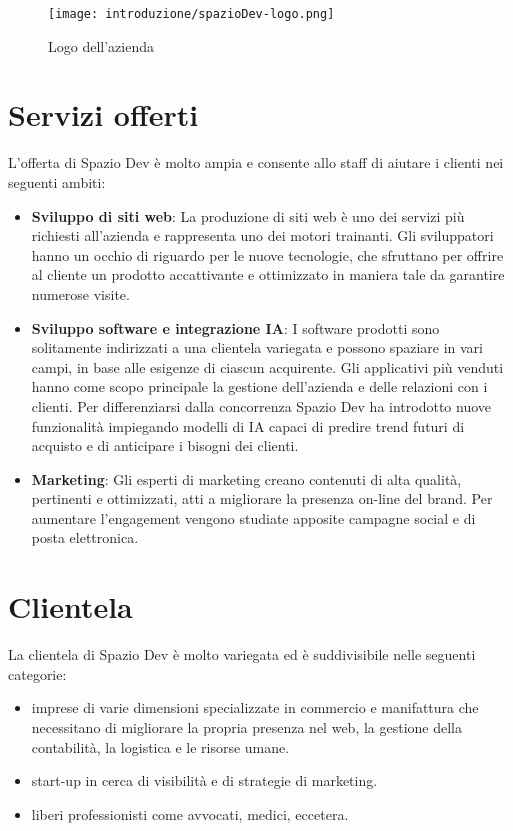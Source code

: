 \begin{figure}[!h] 
  \centering 
  \texttt{[image: introduzione/spazioDev-logo.png]} 
  \caption{Logo dell'azienda}
\end{figure}

\newpage

\section{Servizi offerti}
L'offerta di Spazio Dev è molto ampia e consente allo staff di aiutare i clienti nei seguenti ambiti:
\begin{itemize}
  \item \textbf{Sviluppo di siti web}: La produzione di siti web è uno dei servizi più richiesti all'azienda e rappresenta uno dei motori trainanti. Gli sviluppatori hanno un occhio di riguardo per le nuove tecnologie, che sfruttano per offrire al cliente un prodotto accattivante e ottimizzato in maniera tale da garantire numerose visite.
  \item \textbf{Sviluppo software e integrazione IA}: I software prodotti sono solitamente indirizzati a una clientela variegata e possono spaziare in vari campi, in base alle esigenze di ciascun acquirente. Gli applicativi più venduti hanno come scopo principale la gestione dell'azienda e delle relazioni con i clienti. Per differenziarsi dalla concorrenza Spazio Dev ha introdotto nuove funzionalità impiegando modelli di IA capaci di predire trend futuri di acquisto e  di anticipare i bisogni dei clienti.
  \item \textbf{Marketing}: Gli esperti di marketing creano contenuti di alta qualità, pertinenti e ottimizzati, atti a migliorare la presenza on-line del brand. Per aumentare l'engagement vengono studiate apposite campagne social e di posta elettronica.
\end{itemize}

\section{Clientela}
La clientela di Spazio Dev è molto variegata ed è suddivisibile nelle seguenti categorie:
\begin{itemize}
  \item imprese di varie dimensioni specializzate in commercio e manifattura che necessitano di migliorare la propria presenza nel web, la gestione della contabilità, la logistica e le risorse umane.
  \item start-up in cerca di visibilità e di strategie di marketing.
  \item liberi professionisti come avvocati, medici, eccetera.
\end{itemize}

